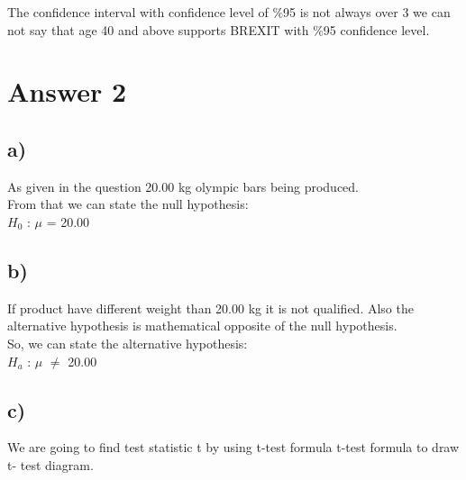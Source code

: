 \documentclass[12pt]{article}
\begin{document}
The confidence interval with confidence level of $\%$95 is not always over 3 we can not say that age 40 and above supports BREXIT with $\%$95 confidence level.\\


\section*{Answer 2}

\subsection*{a)}
As given in the question 20.00 kg olympic bars being produced. \\
From that we can state the null hypothesis:\\
$H_0$ : $\mu$ = 20.00\\


\subsection*{b)}
If product have different weight than 20.00 kg it is not qualified. Also the alternative hypothesis is mathematical opposite of the null hypothesis. \\
So, we can state the alternative hypothesis:\\
$H_a$ : $\mu$ $\neq$ 20.00\\

\subsection*{c)}

We are going to find test statistic t by using t-test formula t-test formula to draw t- test diagram.\\
\end{document}
